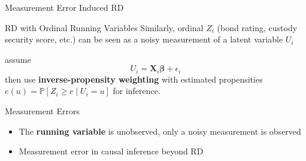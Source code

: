\begin{frame}{Measurement Error Induced RD}
\end{frame}

\begin{frame}{RD with Ordinal Running Variables}
     Similarly, ordinal $Z_i$ {\footnotesize(bond rating, custody security score, etc.)} can be seen as a noisy measurement of a latent variable $U_i$ \citep{li2021regression}

     \citet{li2021regression} assume 
     $$
        U_i = \mathbf{X}_i \mathbf{\beta} +\epsilon_i
     $$
     then use \textcolor{mygreen}{\textbf{inverse-propensity weighting}} with estimated propensities $e(u)=\mathbb{P}\left[ Z_i\geq c\mid U_i=u \right]$ for inference.


\end{frame}

\begin{frame}{Measurement Errors}
    \begin{itemize}
        \item The \textcolor{mygreen}{\textbf{running variable}} is unobserved, only a noisy measurement is observed
        
        \citet{bartalotti2021correction,davezies2017regression,dong2021can,pei2017devil}
        \item Measurement error in causal inference beyond RD
        
        \citet{pearl2012measurement,kuroki2014measurement,jiang2020measurement}
    \end{itemize}
    
\end{frame}

